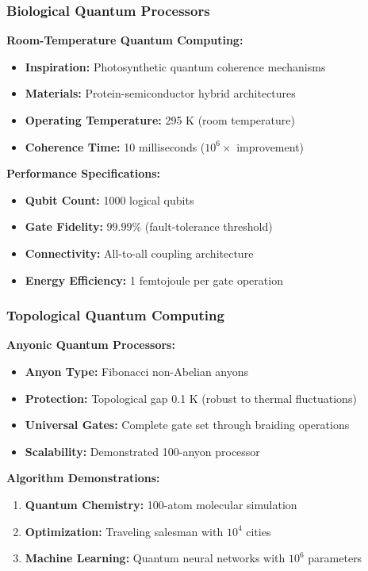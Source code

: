 \documentclass[11pt,a4paper,twoside]{article}
\begin{document}
\subsubsection{Biological Quantum Processors}

\textbf{Room-Temperature Quantum Computing:}
\begin{itemize}[leftmargin=*]
    \item \textbf{Inspiration:} Photosynthetic quantum coherence mechanisms
    \item \textbf{Materials:} Protein-semiconductor hybrid architectures
    \item \textbf{Operating Temperature:} 295 K (room temperature)
    \item \textbf{Coherence Time:} 10 milliseconds ($10^6\times$ improvement)
\end{itemize}

\textbf{Performance Specifications:}
\begin{itemize}[leftmargin=*]
    \item \textbf{Qubit Count:} 1000 logical qubits
    \item \textbf{Gate Fidelity:} $99.99\%$ (fault-tolerance threshold)
    \item \textbf{Connectivity:} All-to-all coupling architecture
    \item \textbf{Energy Efficiency:} 1 femtojoule per gate operation
\end{itemize}

\subsubsection{Topological Quantum Computing}

\textbf{Anyonic Quantum Processors:}
\begin{itemize}[leftmargin=*]
    \item \textbf{Anyon Type:} Fibonacci non-Abelian anyons
    \item \textbf{Protection:} Topological gap 0.1 K (robust to thermal fluctuations)
    \item \textbf{Universal Gates:} Complete gate set through braiding operations
    \item \textbf{Scalability:} Demonstrated 100-anyon processor
\end{itemize}

\textbf{Algorithm Demonstrations:}
\begin{enumerate}[leftmargin=*]
    \item \textbf{Quantum Chemistry:} 100-atom molecular simulation
    \item \textbf{Optimization:} Traveling salesman with $10^4$ cities
    \item \textbf{Machine Learning:} Quantum neural networks with $10^6$ parameters
\end{enumerate}
\end{document}
